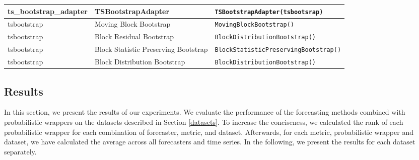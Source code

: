 \begin{table}[]
\begin{tabular}{p{2.5cm}p{4cm}|p{7.5cm}}
         ts\_bootstrap\_adapter & TSBootstrapAdapter & \texttt{TSBootstrapAdapter(tsbootsrap)} \\
         \midrule
 
         tsbootstrap & Moving Block Bootstrap & \texttt{MovingBlockBootstrap()} \\
         tsbootstrap & Block Residual Bootstrap & \texttt{BlockDistributionBootstrap()} \\
         tsbootstrap & Block Statistic Preserving Bootstrap & \texttt{BlockStatisticPreservingBootstrap()} \\
         tsbootstrap & Block Distribution Bootstrap & \texttt{BlockDistributionBootstrap()}\\

         \bottomrule
         
    \end{tabular}
\end{table}




\subsection{Results} \label{results}
In this section, we present the results of our experiments. We evaluate the performance of the forecasting methods combined with probabilistic wrappers on the datasets described in Section \ref{datasets}. 
To increase the conciseness, we calculated the rank of each probabilistic wrapper for each combination of forecaster, metric, and dataset. Afterwards, for each metric, probabilistic wrapper and dataset, we have calculated the average across all forecasters and time series. In the following, we present the results for each dataset separately. 


